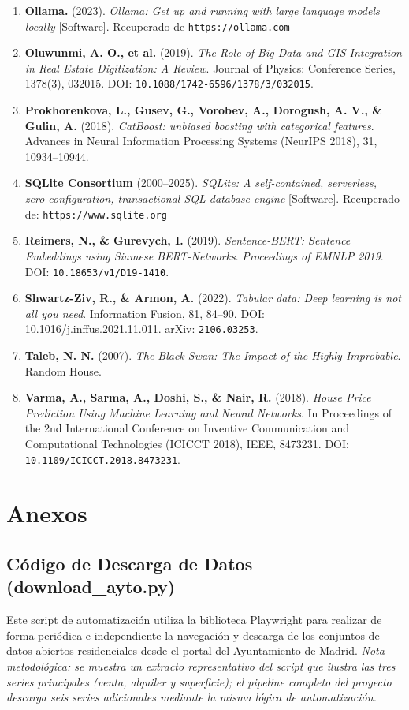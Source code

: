 \documentclass[a4paper,11pt,openany]{book}
\begin{document}
\begin{enumerate}
    \item \textbf{Ollama.} (2023). \textit{Ollama: Get up and running with large language models locally} [Software]. Recuperado de \nolinkurl{https://ollama.com}
    \item \textbf{Oluwunmi, A. O., et al.} (2019). \textit{The Role of Big Data and GIS Integration in Real Estate Digitization: A Review}. Journal of Physics: Conference Series, 1378(3), 032015. DOI: \nolinkurl{10.1088/1742-6596/1378/3/032015}.
    \item \textbf{Prokhorenkova, L., Gusev, G., Vorobev, A., Dorogush, A. V., \& Gulin, A.} (2018). \textit{CatBoost: unbiased boosting with categorical features}. Advances in Neural Information Processing Systems (NeurIPS 2018), 31, 10934--10944.
    \item \textbf{SQLite Consortium} (2000--2025). \textit{SQLite: A self-contained, serverless, zero-configuration, transactional SQL database engine} [Software]. Recuperado de: \nolinkurl{https://www.sqlite.org}
    \item \textbf{Reimers, N., \& Gurevych, I.} (2019). \textit{Sentence-BERT: Sentence Embeddings using Siamese BERT-Networks}. \textit{Proceedings of EMNLP 2019}. DOI: \nolinkurl{10.18653/v1/D19-1410}.
    \item \textbf{Shwartz-Ziv, R., \& Armon, A.} (2022). \textit{Tabular data: Deep learning is not all you need}. Information Fusion, 81, 84--90. DOI: 10.1016/j.inffus.2021.11.011. arXiv: \nolinkurl{2106.03253}.
    \item \textbf{Taleb, N. N.} (2007). \textit{The Black Swan: The Impact of the Highly Improbable}. Random House.
    \item \textbf{Varma, A., Sarma, A., Doshi, S., \& Nair, R.} (2018). \textit{House Price Prediction Using Machine Learning and Neural Networks}. In Proceedings of the 2nd International Conference on Inventive Communication and Computational Technologies (ICICCT 2018), IEEE, 8473231. DOI: \nolinkurl{10.1109/ICICCT.2018.8473231}.
\end{enumerate}

\appendix
\chapter{Anexos}
\section{Código de Descarga de Datos (download\_ayto.py)}
Este script de automatización utiliza la biblioteca Playwright para realizar de forma periódica e independiente la navegación y descarga de los conjuntos de datos abiertos residenciales desde el portal del Ayuntamiento de Madrid. \textit{Nota metodológica: se muestra un extracto representativo del script que ilustra las tres series principales (venta, alquiler y superficie); el pipeline completo del proyecto descarga seis series adicionales mediante la misma lógica de automatización.}
\end{document}
